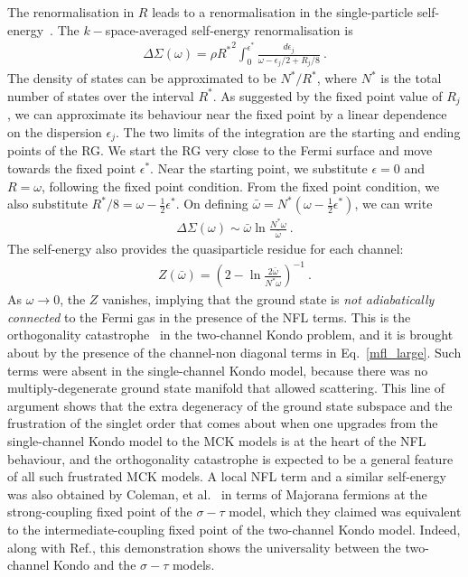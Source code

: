 \documentclass[reprint,prb,superscriptaddress]{revtex4-2}
\begin{document}
The renormalisation in \(R\) leads to a renormalisation in the single-particle self-energy~\cite{anirbanmott1}. The \(k-\)space-averaged self-energy renormalisation is
\begin{equation}\begin{aligned}
	\Delta \Sigma(\omega) = \rho {R^*}^2\int_0^{\epsilon^*} \frac{d\epsilon_j}{\omega - \epsilon_j/2 + R_j/8}~.
\end{aligned}\end{equation}
The density of states can be approximated to be \(N^*/R^*\), where \(N^*\) is the total number of states over the interval \(R^*\). As suggested by the fixed point value of \(R_j\), we can approximate its behaviour near the fixed point by a linear dependence on the dispersion \(\epsilon_j\). The two limits of the integration are the starting and ending points of the RG. We start the RG very close to the Fermi surface and move towards the fixed point \(\epsilon^*\). Near the starting point, we substitute \(\epsilon = 0\) and \(R = \omega\), following the fixed point condition. From the fixed point condition, we also substitute \(R^*/8 = \omega - \frac{1}{2}\epsilon^*\). On defining \(\bar \omega = N^* \left(\omega - \frac{1}{2}\epsilon^*\right)\), we can write
\begin{equation}\begin{aligned}
	\label{self_energy}
	\Delta \Sigma(\omega) \sim  \bar \omega \ln \frac{N^* \omega}{\bar \omega}~.
\end{aligned}\end{equation}
The self-energy also provides the quasiparticle residue for each channel\cite{anirbanmott1}:
\begin{equation}\begin{aligned}
	Z(\bar\omega) = \left(2 - \ln \frac{2\bar\omega}{N^* \omega}\right) ^{-1}~.
\end{aligned}\end{equation}
As \(\omega \to 0\), the \(Z\) vanishes, implying that the ground state is {\it not adiabatically connected} to the Fermi gas in the presence of the NFL terms.
This is the orthogonality catastrophe~\cite{varma2002singular,anderson_infraredcat,yamada_catastrophe,yamada1979orthogonality} in the two-channel Kondo problem, and it is brought about by the presence of the channel-non diagonal terms in Eq.~\ref{mfl_large}.
Such terms were absent in the single-channel Kondo model, because there was no multiply-degenerate ground state manifold that allowed scattering.
This line of argument shows that the extra degeneracy of the ground state subspace and the frustration of the singlet order that comes about when one upgrades from the single-channel Kondo model to the MCK models is at the heart of the NFL behaviour, and the orthogonality catastrophe is expected to be a general feature of all such frustrated MCK models.
A local NFL term and a similar self-energy was also obtained by Coleman, et al.~\cite{Coleman_tsvelik} in terms of Majorana fermions at the strong-coupling fixed point of the \(\sigma-\tau\) model, which they claimed was equivalent to the intermediate-coupling fixed point of the two-channel Kondo model.
Indeed, along with Ref.\cite{schofield_1997}, this demonstration shows the universality between the two-channel Kondo and the \(\sigma-\tau\) models. 
\end{document}
